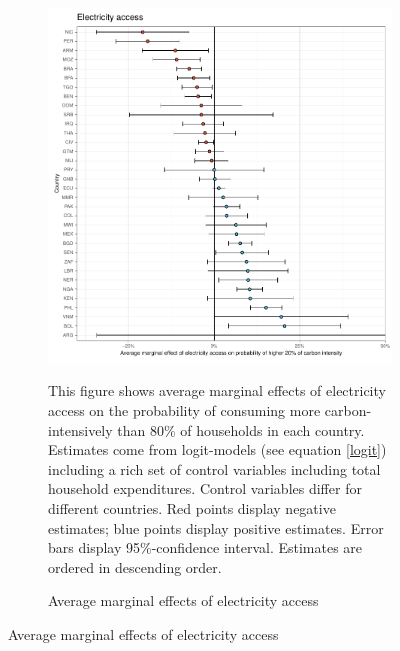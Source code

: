 \begin{figure}[ht!]\ContinuedFloat
   \centering
   \begin{subfigure}[b]{\textwidth}
   \centering
   \includegraphics{1_Figures/Analysis_Logit_Models_Marginal_Effects/Average_Marginal_Effects_affected_upper_80_electricity.access_2017B.pdf}
   \caption{Average marginal effects of electricity access} \label{fig:Logit_ME_electricity}
   \begin{subcaption2}
     This figure shows average marginal effects of electricity access on the probability of consuming more carbon-intensively than 80\% of households in each country. Estimates come from logit-models (see equation \ref{logit}) including a rich set of control variables including total household expenditures. Control variables differ for different countries. Red points display negative estimates; blue points display positive estimates. Error bars display 95\%-confidence interval. Estimates are ordered in descending order.
   \end{subcaption2}
   \end{subfigure}
 \end{figure}
 \clearpage

